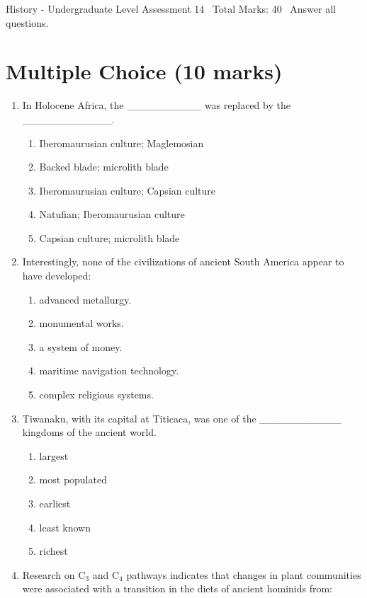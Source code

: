 \documentclass[12pt]{article}
\begin{document}
\begin{center}
History - Undergraduate Level Assessment 14 \
Total Marks: 40 \
Answer all questions.
\end{center}

\section*{Multiple Choice (10 marks)}
\begin{enumerate}[label=\arabic*.]
\item In Holocene Africa, the \_\_\_\_\_\_\_\_\_\_ was replaced by the \_\_\_\_\_\_\_\_\_\_\_\_.
\begin{enumerate}[label=(\alph*)]
    \item Iberomaurusian culture; Maglemosian
    \item Backed blade; microlith blade
    \item Iberomaurusian culture; Capsian culture
    \item Natufian; Iberomaurusian culture
    \item Capsian culture; microlith blade
\end{enumerate}
\item Interestingly, none of the civilizations of ancient South America appear to have developed:
\begin{enumerate}[label=(\alph*)]
    \item advanced metallurgy.
    \item monumental works.
    \item a system of money.
    \item maritime navigation technology.
    \item complex religious systems.
\end{enumerate}
\item Tiwanaku, with its capital at Titicaca, was one of the \_\_\_\_\_\_\_\_\_\_\_ kingdoms of the ancient world.
\begin{enumerate}[label=(\alph*)]
    \item largest
    \item most populated
    \item earliest
    \item least known
    \item richest
\end{enumerate}
\item Research on C$_{3}$ and C$_{4}$ pathways indicates that changes in plant communities were associated with a transition in the diets of ancient hominids from:

\end{enumerate}
\end{document}
